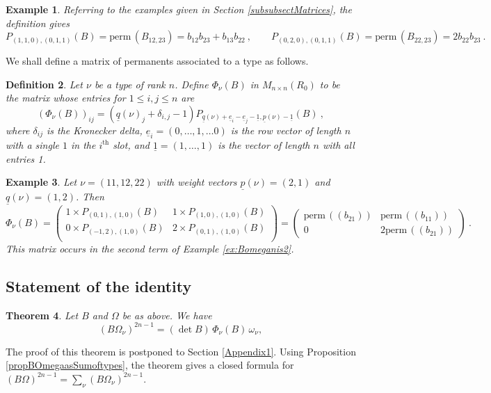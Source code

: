 \documentclass[10pt]{amsart}
\newcommand{\pp}{{\underline{p}}}
\newcommand{\qq}{{\underline{q}}}
\newcommand{\eee}{{\underline{e}}}
\newcommand{\one}{{\underline{1}}}
\newcommand{\perm}{\mathrm{perm}\,}
\theoremstyle{plain}
\newtheorem{thm}{Theorem}
\newtheorem{defn}[thm]{Definition}
\newtheorem{ex}[thm]{Example}
\newcommand{\0}{\color{blue}{\mathsf{0}}}
\begin{document}
\begin{ex} Referring to the examples given in Section  \ref{subsubsectMatrices}, the definition gives
\[  P_{(1,1,0),(0,1,1)} (B)= \perm (B_{12,23}) = b_{12}b_{23}+b_{13}b_{22} 
\ , \qquad   
P_{(0,2,0),(0,1,1)} (B)= \perm (B_{22,23}) =  2 b_{22}b_{23}  \ . 
\]
\end{ex}

We shall define a matrix of permanents associated to a type as follows.

\begin{defn} Let $\nu $ be a type of rank $n$. Define
$   \Phi_{\nu}(B) $ in $M_{n\times n}(R_0)$ to be the matrix whose entries for $1 \leq i , j \leq n$ are 
\begin{equation} \label{Phidef}
\left( \Phi_{\nu}(B)\right)_{ij} =    (\qq(\nu)_j+\delta_{i,j}-1)
P_{\qq(\nu)+\eee_i-\eee_j-\one,\pp(\nu)-\one}(B)\ ,
\end{equation}
where $\delta_{ij}$ is the Kronecker delta, $\eee_i=(0,\ldots, 1, \ldots 0)$ is the row vector of length $n$ with a single $1$ in the $i^{\mathrm{th}}$ slot, and $\one=(1,\ldots,1)$ is the vector  of length $n$ with all entries 1.
\end{defn}
\begin{ex} Let $\nu= (11,12,22)$ with weight vectors   $\pp(\nu)= (2,1)$ and $\qq(\nu)=(1,2)$. Then 
\[ \Phi_{\nu}(B) = \begin{pmatrix}   1 \times P_{(0,1), (1,0)}(B)  &   1 \times  P_{(1,0), (1,0)}(B)  \\
    0 \times   P_{(-1,2), (1,0)} (B)   &   2 \times  P_{(0,1), (1,0)}(B)  \\ 
\end{pmatrix} =   \begin{pmatrix}  \perm((b_{21})) &  \perm((b_{11})) \\ 
0 &  2  \perm((b_{21}))
\end{pmatrix}\ .\]
This matrix occurs  in the second term of Example \ref{ex:Bomeganis2}. 
    \end{ex}

\subsection{Statement of the identity} \label{sect: statementid}

\begin{thm}\label{thm1}
Let $B$ and $\Omega$ be as above. We have
\begin{equation}\label{eqthm1a}
(B\Omega_{\nu})^{2n-1} = \left( \det B\right) \, \Phi_{\nu}(B) \,\omega_\nu,
\end{equation}
\end{thm} 
The proof of this theorem is postponed to Section \ref{Appendix1}. Using  Proposition \ref{propBOmegaasSumoftypes}, the  theorem gives a closed formula for $(B\Omega)^{2n-1} = \sum_{\nu} (B\Omega_{\nu})^{2n-1}$. 
\end{document}
